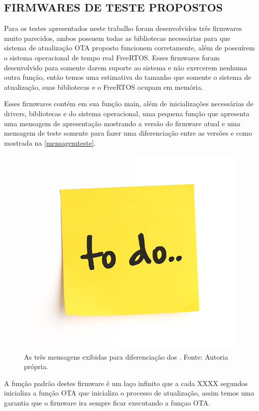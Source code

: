 \subsection {FIRMWARES DE TESTE PROPOSTOS}
Para os testes apresentados neste trabalho foram desenvolvidos três firmwares muito parecidos, ambos possuem todas as bibliotecas necessárias para que sistema de atualização OTA proposto funcionem corretamente, além de possuírem o sistema operacional de tempo real FreeRTOS. Esses firmwares foram desenvolvido para somente darem suporte ao sistema e não exercerem nenhuma outra função, então temos uma estimativa do tamanho que somente o sistema de atualização, suas bibliotecas e o FreeRTOS ocupam em memória.

Esses firmwares contém em sua função main, além de inicializações necessárias de drivers, bibliotecas e do sistema operacional, uma pequena função que apresenta uma mensagem de apresentação mostrando a versão do firmware atual e uma mensagem de teste somente para fazer uma diferenciação entre as versões e como mostrada na \autoref{mensagemteste}. 

\begin{figure}[H]
    \scriptsize
     \centering
     \includegraphics[scale=1.2]{dados/figuras/ToDo.jpg}
     \caption{As três mensagens exibidas para diferenciação dos \firmware. \newline Fonte: Autoria própria.}
     \label{mensagemteste}
\end{figure}

A função padrão destes firmware é um laço infinito que a cada XXXX segundos inicializa a função OTA que inicializa o processo de atualização, assim temos uma garantia que o firmware ira sempre ficar executando a funçao OTA.